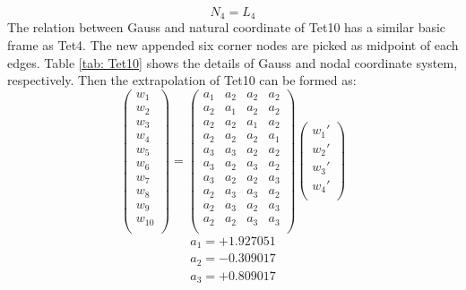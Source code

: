 \begin{equation}
N_4 = L_4
\end{equation}
The relation between Gauss and natural coordinate of Tet10 has a similar basic frame as Tet4. The new appended six corner nodes are picked as midpoint of each edges. Table \ref{tab: Tet10} shows the details of Gauss and nodal coordinate system, respectively. Then the extrapolation of Tet10 can be formed as:
\begin{equation}
\begin{pmatrix}
w_1 \\
w_2 \\
w_3 \\
w_4 \\
w_5 \\
w_6 \\
w_7 \\
w_8 \\
w_9 \\
w_{10} \\
\end{pmatrix} = \begin{pmatrix}
a_1 & a_2 &  a_2 &  a_2      \\[0.3em]
a_2 & a_1 &  a_2 &  a_2      \\[0.3em]
a_2 & a_2 &  a_1 &  a_2      \\[0.3em]
a_2 & a_2 &  a_2 &  a_1      \\[0.3em]
a_3 & a_3 &  a_2 &  a_2      \\[0.3em]
a_3 & a_2 &  a_3 &  a_2      \\[0.3em]
a_3 & a_2 &  a_2 &  a_3      \\[0.3em]
a_2 & a_3 &  a_3 &  a_2      \\[0.3em]
a_2 & a_3 &  a_2 &  a_3      \\[0.3em]
a_2 & a_2 &  a_3 &  a_3      \\[0.3em]
\end{pmatrix} \begin{pmatrix}
{w_1}' \\
{w_2}' \\
{w_3}' \\
{w_4}' \\
\end{pmatrix}
\end{equation}	
\begin{align*}
a_1 = +1.927051 \\
a_2 = -0.309017 \\
a_3 = +0.809017
\end{align*}

